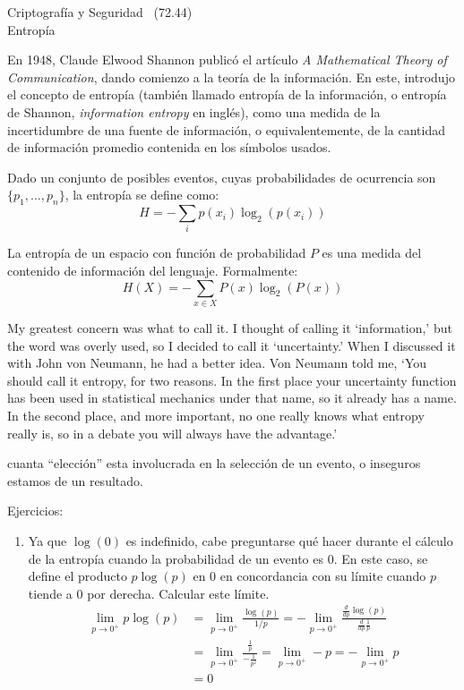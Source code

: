\documentclass[]{book}
\theoremstyle{definition}
\begin{document}
\begin{center}
  {\Large Criptografía y Seguridad \the\year~(72.44)\\[.2cm]
Entropía}\\
\end{center}

\vspace{0.2 cm}


En 1948, Claude Elwood Shannon publicó el artículo \textit{A Mathematical
Theory of Communication}, dando comienzo a la teoría de la información. En
este, introdujo el concepto de entropía (también llamado entropía de la
información, o entropía de Shannon, \textit{information entropy} en
inglés), como una medida de la incertidumbre de una fuente de información, o
equivalentemente, de la cantidad de información promedio contenida en los
símbolos usados.

Dado un conjunto de posibles eventos, cuyas probabilidades de ocurrencia son $\{p_1,\dots,p_n\}$, la entropía se define como:
\[ H = -\sum_i p(x_i)\log_2(p(x_i))\]

La entropía de un espacio con función de probabilidad $P$ es una medida del
contenido de información del lenguaje. Formalmente:
\[ H(X) = -\sum_{x \in X} P(x)\log_2(P(x)) \]


My greatest concern was what to call it. I thought of calling it `information,'
but the word was overly used, so I decided to call it `uncertainty.' When I
discussed it with John von Neumann, he had a better idea. Von Neumann told me,
`You should call it entropy, for two reasons. In the first place your
uncertainty function has been used in statistical mechanics under that name, so
it already has a name. In the second place, and more important, no one really
knows what entropy really is, so in a debate you will always have the
advantage.' 

cuanta ``elección'' esta involucrada en la
selección de un evento, o inseguros estamos de un resultado.

Ejercicios:
\begin{enumerate}
  \item Ya que $\log(0)$ es indefinido, cabe preguntarse qué hacer durante el
    cálculo de la entropía cuando la probabilidad de un evento es 0. En este
    caso, se define el producto $p\log(p)$ en 0 en concordancia con su límite
    cuando $p$ tiende a $0$ por derecha. Calcular este límite.  \begin{align*}
      \lim_{p\to0^+} p \log(p) &= \lim_{p\to0^+} \frac{\log(p)}{1/p} =
      -\lim_{p\to0^+} \frac{\frac{d}{dp}\log(p)}{\frac{d}{dp}\frac{1}{p}} \\ &=
      \lim_{p\to0^+} \frac{\frac{1}{p}}{-\frac{1}{p^2}} = \lim_{p\to0^+} -p =
      -\lim_{p\to0^+} p\\ &= 0 \end{align*}

\end{enumerate}
\end{document}
